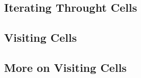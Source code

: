 


\subsection{Iterating Throught Cells}
\label{sec:MeshCellsIteration}




\subsection{Visiting Cells}
\label{sec:MeshCellVisitor}




\subsection{More on Visiting Cells}
\label{sec:MeshCellVisitorMultipleType}




